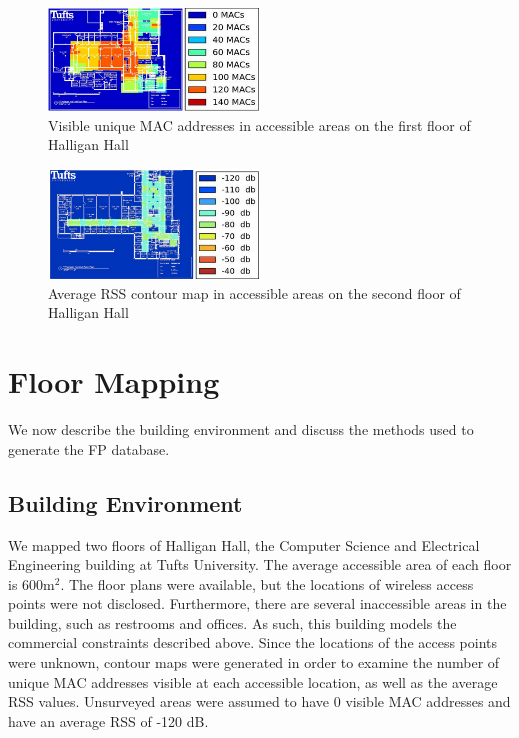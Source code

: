\documentclass[conference]{IEEEtran}
\begin{document}
\begin{figure}[t!]
  \centering
    \includegraphics[width=0.5\textwidth]{APContour}
    \caption{Visible unique MAC addresses in accessible areas on the first floor of Halligan Hall}
    \label{fig:visible_unique_macs}
\end{figure}


\begin{figure}[t!]
  \centering
    \includegraphics[width=0.5\textwidth]{dbContour}
   \caption{Average RSS contour map in accessible areas on the second floor of Halligan Hall}
   \label{fig:rss_contour_map}
\end{figure}

\section{Floor Mapping}
We now describe the building environment and discuss the methods used to generate the FP database.
\subsection{Building Environment}
We mapped two floors of Halligan Hall, the Computer Science and Electrical Engineering building at Tufts University. The average accessible area of each floor is 600m$^2$. The floor plans were available, but the locations of wireless access points were not disclosed. Furthermore, there are several inaccessible areas in the building, such as restrooms and offices. As such, this building models the commercial constraints described above. Since the locations of the access points were unknown, contour maps were generated in order to examine the number of unique MAC addresses visible at each accessible location, as well as the average RSS values. Unsurveyed areas were assumed to have 0 visible MAC addresses and have an average RSS of -120 dB. 
\end{document}
